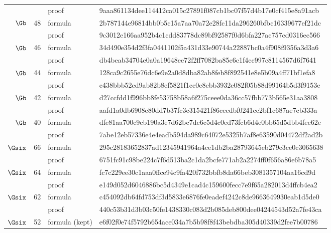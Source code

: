 \begin{longtable}{@{}rrll@{}}
 & & proof & {\tiny\ttfamily 9aaa861134dee114412ca015c27891f087cb1bc07f57d4b17e0cf415e8a91acb} \\
$\Gb$ & 48 & formula & {\tiny\ttfamily 2b787144e96814bb0b5c15a7aa70a72e28fc11da296260bfbc16339677ef21dc} \\
 & & proof & {\tiny\ttfamily 9c3012e166aa952b4c1cdd83778dc89bf92587f0d6bfa227ac757cd0316ec566} \\
$\Gb$ & 46 & formula & {\tiny\ttfamily 34d490e354d2f3fa0441102f5a431d33e90744a22887bc0a4f908f9356a3d3a6} \\
 & & proof & {\tiny\ttfamily db4beab34704e0a0a19648ee72f2ff7082ba85c6c1f4cc997c8114567d6f7641} \\
$\Gb$ & 44 & formula & {\tiny\ttfamily 128ca9c2655e76dc6e9e2a0d8dba82ab8feb8f892541e8e5b09a4ff71bf1efa8} \\
 & & proof & {\tiny\ttfamily c438bbb52ed9ab82b8ef5821f1cc0c8ebb3932e082f05b88d99164b5d3f9153e} \\
$\Gb$ & 42 & formula & {\tiny\ttfamily d27ccfdd1f996bb8fe53758b58a6f275ceee0da36cc57fbb773b565e31aa3808} \\
 & & proof & {\tiny\ttfamily aafd1a0db6908e80dd7b37fc3c315421f86ceedbf0241cc2bf1c687ae7cb333a} \\
$\Gb$ & 40 & formula & {\tiny\ttfamily dfe81aa700c9cb190a3e7d62bc7dc6c5d4c0ed73fcb6d4e0bb65d5dbb4fec62e} \\
 & & proof & {\tiny\ttfamily 7abe12eb57336e4e4eadb594da989c64072e5325b7af8e63590d04472df2ad2b} \\
$\Gsix$ & 66 & formula & {\tiny\ttfamily 295c28183652837ad12345941964a4ce1db2ba28793645eb279c3ce0c3065638} \\
 & & proof & {\tiny\ttfamily 6751fc91c98be224c7f6d513ba2c1da2bcfe771ab2a2274ff0f656a86e6b78a5} \\
$\Gsix$ & 64 & formula & {\tiny\ttfamily fc7c229ee30c1aaa0ffce94c9fa420f732bbfb8da66beb3081357104aa16cd9d} \\
 & & proof & {\tiny\ttfamily e149d052d6046886bc5d4349e1cad4c159600fecc7e9f65a282013d4ffcb4ea2} \\
$\Gsix$ & 62 & formula & {\tiny\ttfamily c454092db64fd753df3d5833e6876fe0eadef4242c8de9663649930eab1d5de0} \\
 & & proof & {\tiny\ttfamily 440c53b31d3b03c50fe1438330c083d2b085deb800dee04244543d52a7fe43ca} \\
$\Gsix$ & 52 & formula (kept) & {\tiny\ttfamily e6f02f0e74f5792b654ace034a7b5b98f8f43bebdba305d40339d2fee7b00786} \\
\end{longtable}
